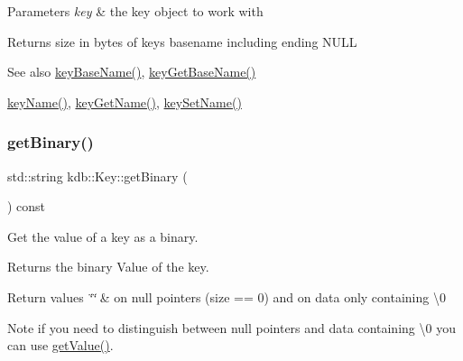 \begin{DoxyParams}{Parameters}
{\em key} & the key object to work with \\
\hline
\end{DoxyParams}
\begin{DoxyReturn}{Returns}
size in bytes of {\ttfamily key\textquotesingle{}s} basename including ending N\+U\+LL 
\end{DoxyReturn}
\begin{DoxySeeAlso}{See also}
\mbox{\hyperlink{group__keyname_gaaff35e7ca8af5560c47e662ceb9465f5}{key\+Base\+Name()}}, \mbox{\hyperlink{group__keyname_ga0992d26bcfca767cb8e77053a483eb64}{key\+Get\+Base\+Name()}} 

\mbox{\hyperlink{group__keyname_ga8e805c726a60da921d3736cda7813513}{key\+Name()}}, \mbox{\hyperlink{group__keyname_gab29a850168d9b31c9529e90cf9ab68be}{key\+Get\+Name()}}, \mbox{\hyperlink{group__keyname_ga7699091610e7f3f43d2949514a4b35d9}{key\+Set\+Name()}} 
\end{DoxySeeAlso}
\mbox{\label{classkdb_1_1Key_ada114aba31b321ddc984018b43a8568b}} 
\subsubsection{\texorpdfstring{getBinary()}{getBinary()}}
{\footnotesize\ttfamily std\+::string kdb\+::\+Key\+::get\+Binary (\begin{DoxyParamCaption}{ }\end{DoxyParamCaption}) const\hspace{0.3cm}{\ttfamily [inline]}}



Get the value of a key as a binary. 

\begin{DoxyReturn}{Returns}
the binary Value of the key.
\end{DoxyReturn}

\begin{DoxyRetVals}{Return values}
{\em \char`\"{}\char`\"{}} & on null pointers (size == 0) and on data only containing \textbackslash{}0\\
\hline
\end{DoxyRetVals}
\begin{DoxyNote}{Note}
if you need to distinguish between null pointers and data containing \textbackslash{}0 you can use \mbox{\hyperlink{classkdb_1_1Key_a444c6f254536196a7031288e9f4c3088}{get\+Value()}}.
\end{DoxyNote}

